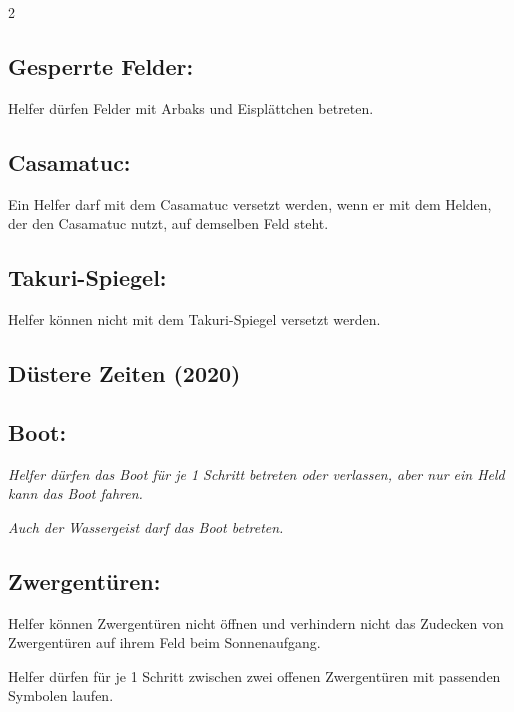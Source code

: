 \documentclass[10pt, a4paper, oneside]{book}
\newcommand{\fan}[1]{\textit{#1}}
\begin{document}
\begin{multicols*}{2}
\begin{bgcolor}[color-AG]
\subsection{Gesperrte Felder:}

Helfer dürfen Felder mit Arbaks und Eisplättchen betreten. 
\supercite{AG:Begleitheft,MH:Begleitheft}


\subsection{Casamatuc:}

Ein Helfer darf mit dem Casamatuc versetzt werden, wenn er mit dem Helden, der den Casamatuc nutzt, auf demselben Feld steht. 
\supercite{AG:Begleitheft}

\subsection{Takuri-Spiegel:}

Helfer können nicht mit dem Takuri-Spiegel versetzt werden.
\supercite{AG:Begleitheft}

\end{bgcolor}



\columnbreak


\begin{bgcolor}[color-DZ]
\section{Düstere Zeiten (2020)}

\subsection{Boot:}

\fan{Helfer dürfen das Boot für je 1 Schritt betreten oder verlassen, aber nur ein Held kann das Boot fahren.}

\fan{Auch der Wassergeist darf das Boot betreten.}


\subsection{Zwergentüren:}

Helfer können Zwergentüren nicht öffnen und verhindern nicht das Zudecken von Zwergentüren auf ihrem Feld beim Sonnenaufgang.
\supercite{DZ:Begleitheft}

Helfer dürfen für je 1 Schritt zwischen zwei offenen Zwergentüren mit passenden Symbolen laufen.




\end{bgcolor}
\end{multicols*}
\end{document}
